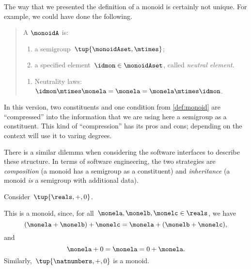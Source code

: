 \begin{remark}
    The way that we presented the definition of a monoid is certainly not unique.
    For example, we could have done the following.
    \begin{quote}
        A \emph{} $\monoidA$ is:
        \begin{body}
            \constit
            \begin{enumerate}
                \item a semigroup~$\tup{\monoidAset, \mtimes}$;
                \item a specified element~$\idmon\in \monoidAset$, called \emph{neutral element}.
            \end{enumerate}
            \condit
            \begin{enumerate}
                \item Neutrality laws:~$\idmon\mtimes \monela= \monela= \monela \mtimes \idmon$.
            \end{enumerate}
        \end{body}
    \end{quote}
    In this version, two constituents and one condition from \cref{def:monoid} are ``compressed'' into the information that we are using here a semigroup as a constituent.
    This kind of ``compression'' has its pros and cons; depending on the context will use it to varing degrees.

    There is a similar dilemma when considering the software interfaces to describe these structure.
    In terms of software engineering, the two strategies are \emph{composition} (a monoid has a semigroup as a constituent) and \emph{inheritance} (a monoid \emph{is} a semigroup with additional data).

\end{remark}

\begin{example}
    Consider~$\tup{\reals,+,0}$.

    This is a monoid, since, for all~$\monela,\monelb, \monelc \in \reals$, we have
    \begin{equation*}
        (\monela+\monelb)
        +\monelc=\monela+(\monelb+\monelc),
    \end{equation*}
    and
    \begin{equation*}
        \monela+0=\monela=0+\monela.
    \end{equation*}
    Similarly,~$\tup{\natnumbers, +,0}$ is a monoid.
\end{example}

